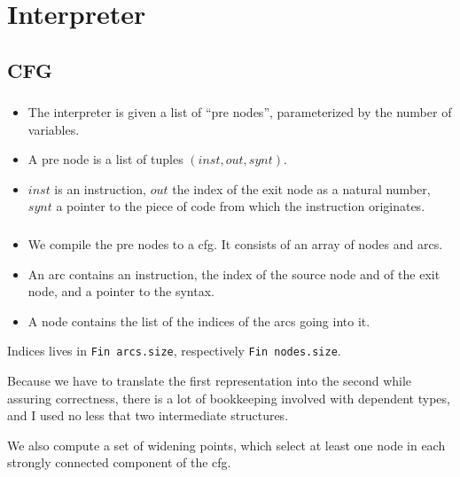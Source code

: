 \documentclass[professionalfonts]{beamer}
\makeatletter
\newcommand*{\currentname}{\@currentlabelname}
\def\ft{\frametitle{\currentname}}
\makeatother
\begin{document}
\section{Interpreter}
\subsection{CFG}
\begin{frame}
  \ft{}
  \begin{itemize}
  \item The interpreter is given a list of ``pre nodes'', parameterized by the number of
    variables.
  \item A pre node is a list of tuples $(inst, out, synt)$.
  \item $inst$ is an instruction, $out$ the index of the exit node as a natural number, $synt$ a
    pointer to the piece of code from which the instruction originates.
  \end{itemize}
\end{frame}

\begin{frame}
  \ft{}
  \begin{itemize}
  \item We compile the pre nodes to a cfg. It consists of an array of nodes and arcs.
  \item An arc contains an instruction, the index of the source node and of the exit node, and a
    pointer to the syntax.
  \item A node contains the list of the indices of the arcs going into it.
  \end{itemize}
  Indices lives in \texttt{Fin arcs.size}, respectively \texttt{Fin nodes.size}.

  Because we have to translate the first representation into the second while
  assuring correctness, there is a lot of bookkeeping
  involved with dependent types, and I used
  no less that two intermediate structures.

  We also compute a set of widening points, which select at least
  one node in each strongly connected component of the cfg.
\end{frame}
\end{document}
